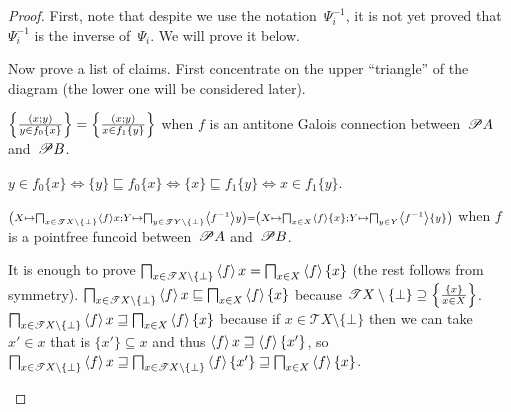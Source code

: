 \begin{proof}
First, note that despite we use the notation~$\Psi_i^{-1}$, it is not yet proved that~$\Psi_i^{-1}$ is the inverse of~$\Psi_i$. We will prove it below.

Now prove a list of claims. First concentrate on the upper ``triangle'' of the diagram (the lower one will be considered later).

\begin{claim}
$\left\{ \frac{(x;y)}{y\in f_0\{x\}}\right\}=\left\{ \frac{(x;y)}{x\in f_1\{y\}}\right\}$ when $f$ is an antitone Galois connection between~$\mathscr{P} A$ and~$\mathscr{P} B$.
\end{claim}
\begin{claimproof}
$y\in f_0\{x\}\Leftrightarrow\{y\}\sqsubseteq f_0\{x\}\Leftrightarrow\{x\}\sqsubseteq f_1\{y\}\Leftrightarrow x\in f_1\{y\}$.
\end{claimproof}

\begin{claim}
$\scriptstyle \left(X\mapsto\bigsqcap_{x\in\mathscr{T} X\setminus\{\bot\}}\left\langle f\right\rangle x;Y\mapsto\bigsqcap_{y\in\mathscr{T} Y\setminus\{\bot\}}\left\langle f^{-1}\right\rangle y\right)=
\left(X\mapsto\bigsqcap_{x\in X}\left\langle f\right\rangle\{x\};Y\mapsto\bigsqcap_{y\in Y}\left\langle f^{-1}\right\rangle\{y\}\right)$
when $f$ is a pointfree funcoid between~$\mathscr{P} A$ and~$\mathscr{P} B$.
\end{claim}
\begin{claimproof}
It is enough to prove $\bigsqcap_{x\in\mathscr{T} X\setminus\{\bot\}}\left\langle f\right\rangle x = \bigsqcap_{x\in X}\left\langle f\right\rangle\{x\}$ (the rest follows from symmetry).
$\bigsqcap_{x\in\mathscr{T} X\setminus\{\bot\}}\left\langle f\right\rangle x \sqsubseteq \bigsqcap_{x\in X}\left\langle f\right\rangle\{x\}$ because
$\mathscr{T} X\setminus\{\bot\}\supseteq\left\{ \frac{\{x\}}{x\in X}\right\}$.
$\bigsqcap_{x\in\mathscr{T} X\setminus\{\bot\}}\left\langle f\right\rangle x \sqsupseteq \bigsqcap_{x\in X}\left\langle f\right\rangle\{x\}$ because
if $x\in\mathscr{T} X\setminus\{\bot\}$ then we can take $x'\in x$ that is $\{x'\}\subseteq x$ and thus
$\left\langle f\right\rangle x \sqsupseteq \left\langle f\right\rangle\{x'\}$, so
$\bigsqcap_{x\in\mathscr{T} X\setminus\{\bot\}}\left\langle f\right\rangle x \sqsupseteq \bigsqcap_{x\in\mathscr{T} X\setminus\{\bot\}}\left\langle f\right\rangle\{x'\} \sqsupseteq
\bigsqcap_{x\in X}\left\langle f\right\rangle\{x\}$.
\end{claimproof}


\end{proof}

